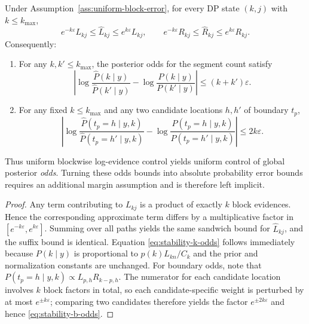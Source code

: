 \begin{proposition}
\label{prop:stability}
Under Assumption~\ref{ass:uniform-block-error}, for every DP state $(k,j)$ with $k\le k_{\max}$,
\[
e^{-k\varepsilon}L_{k j}\le \widehat{L}_{k j}\le e^{k\varepsilon}L_{k j},
\qquad
e^{-k\varepsilon}R_{k j}\le \widehat{R}_{k j}\le e^{k\varepsilon}R_{k j}.
\]
Consequently:
\begin{enumerate}
\item For any $k,k'\le k_{\max}$, the posterior odds for the segment count satisfy
\begin{equation}
\left|
\log\frac{\widehat{P}(k\mid y)}{\widehat{P}(k'\mid y)}
-\log\frac{P(k\mid y)}{P(k'\mid y)}
\right|
\le (k+k')\varepsilon.
\label{eq:stability-k-odds}
\end{equation}
\item For any fixed $k\le k_{\max}$ and any two candidate locations $h,h'$ of boundary $t_p$,
\begin{equation}
\left|
\log\frac{\widehat{P}(t_p=h\mid y,k)}{\widehat{P}(t_p=h'\mid y,k)}
-\log\frac{P(t_p=h\mid y,k)}{P(t_p=h'\mid y,k)}
\right|
\le 2k\varepsilon.
\label{eq:stability-b-odds}
\end{equation}
\end{enumerate}
Thus uniform blockwise log-evidence control yields uniform control of global posterior \emph{odds}. Turning
these odds bounds into absolute probability error bounds requires an additional margin assumption and is
therefore left implicit.
\end{proposition}

\begin{proof}
Any term contributing to $L_{k j}$ is a product of exactly $k$ block evidences. Hence the corresponding
approximate term differs by a multiplicative factor in $[e^{-k\varepsilon},e^{k\varepsilon}]$. Summing over all
paths yields the same sandwich bound for $\widehat{L}_{k j}$, and the suffix bound is identical. Equation
\eqref{eq:stability-k-odds} follows immediately because $P(k\mid y)$ is proportional to $p(k)L_{k n}/C_k$ and the
prior and normalization constants are unchanged. For boundary odds, note that
$P(t_p=h\mid y,k)\propto L_{p,h}R_{k-p,h}$. The numerator for each candidate location involves $k$ block factors in
total, so each candidate-specific weight is perturbed by at most $e^{\pm k\varepsilon}$; comparing two candidates
therefore yields the factor $e^{\pm 2k\varepsilon}$ and hence \eqref{eq:stability-b-odds}.
\end{proof}

